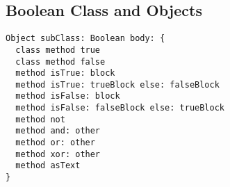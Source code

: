 \subsection {Boolean Class and Objects}

\begin{lstlisting}
Object subClass: Boolean body: {
  class method true
  class method false
  method isTrue: block
  method isTrue: trueBlock else: falseBlock
  method isFalse: block
  method isFalse: falseBlock else: trueBlock
  method not
  method and: other
  method or: other
  method xor: other
  method asText
}
\end{lstlisting}
